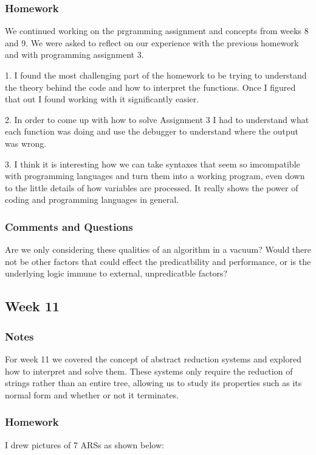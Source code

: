\documentclass{article}
\theoremstyle{theorem}
\theoremstyle{definition}
\theoremstyle{remark}
\begin{document}
\subsubsection{Homework}
We continued working on the prgramming assignment and concepts from weeks 8 and 9. We were asked to reflect on our experience with the previous homework and with programming assignment 3. 

\hspace{0.65cm}1. I found the most challenging part of the homework to be trying to understand the theory behind the code 
and how to interpret the functions. Once I figured that out I found working with it significantly easier.

\hspace{0.65cm}2. In order to come up with how to solve Assignment 3 I had to understand what each function was doing and use the debugger to understand where the output was wrong.

\hspace{0.65cm}3. I think it is interesting how we can take syntaxes that seem so imcompatible with programming languages and turn them into a working program, even down to the little details of how variables are processed. It really shows the power of coding and programming languages in general. 

\subsubsection{Comments and Questions}
Are we only considering these qualities of an algorithm in a vacuum? Would there not be other factors that could effect the predicatbility and performance, or is the underlying logic immune to external, unpredicatble factors?

\subsection{Week 11}

\subsubsection{Notes}
For week 11 we covered the concept of abstract reduction systems and explored how to interpret and solve them. These systems only require the reduction of strings rather than an entire tree, allowing us 
to study its properties such as its normal form and whether or not it terminates. 

\subsubsection{Homework}
I drew pictures of 7 ARSs as shown below:
\end{document}
